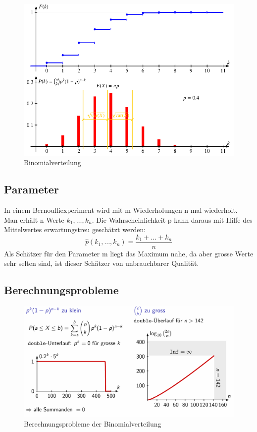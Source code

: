\documentclass[../Main.tex]{subfiles}
\begin{document}
\begin{figure}[H]
    \centering
    \includegraphics[width=0.75\linewidth]{Images/binomial-verteilung.png}
    \caption{Binomialverteilung}
\end{figure}


\subsection{Parameter}
In einem Bernoulliexperiment wird mit m Wiederholungen n mal wiederholt. Man erhält n Werte
 \(k_1,\dots, k_n\). Die Wahrscheinlichkeit p kann daraus mit Hilfe des Mittelwertes erwartungstreu
 geschätzt werden:
\begin{equation}
    \hat{p}(k_1,\dots , k_n) = \frac{k_1 + \dots + k_n}{n}
\end{equation}
Als Schätzer für den Parameter m liegt das Maximum nahe, da aber grosse Werte sehr selten
sind, ist dieser Schätzer von unbrauchbarer Qualität.

\subsection{Berechnungsprobleme}

\begin{figure}[H]
    \centering
    \includegraphics[width=0.75\linewidth]{Images/binom-berechnungsprobleme.png}
    \caption{Berechnungsprobleme der Binomialverteilung}
\end{figure}
\end{document}
